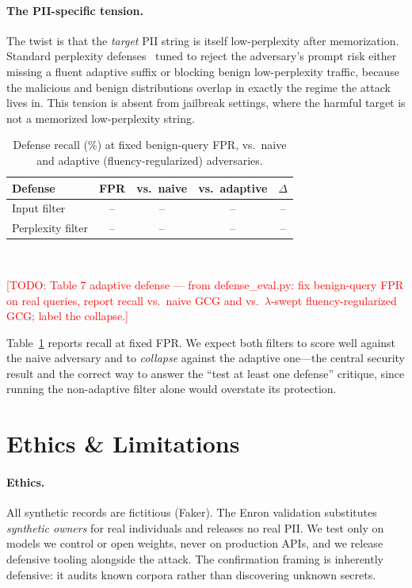 \documentclass[letterpaper,twocolumn,10pt]{article}
\newcommand{\todo}[1]{\textcolor{red}{[TODO: #1]}}
\begin{document}
\paragraph{The PII-specific tension.}
The twist is that the \emph{target} PII string is itself low-perplexity after
memorization. Standard perplexity
defenses~\cite{jain2023baseline} tuned to reject the adversary's prompt risk
either missing a fluent adaptive suffix or blocking benign low-perplexity
traffic, because the malicious and benign distributions overlap in exactly the
regime the attack lives in. This tension is absent from jailbreak settings,
where the harmful target is not a memorized low-perplexity string.

\begin{table}[t]
\centering
\caption{Defense recall (\%) at fixed benign-query FPR, vs.\ naive and adaptive
(fluency-regularized) adversaries.}
\label{tab:defense}
\small
\begin{tabular}{@{}lcccc@{}}
\toprule
\textbf{Defense} & \textbf{FPR} & \textbf{vs.\ naive} & \textbf{vs.\ adaptive} & \textbf{$\Delta$} \\
\midrule
Input filter      & -- & -- & -- & -- \\
Perplexity filter & -- & -- & -- & -- \\
\bottomrule
\end{tabular}
\\[2pt]
\raggedright\footnotesize
\todo{Table 7 adaptive defense --- from defense\_eval.py: fix benign-query FPR
on real queries, report recall vs.\ naive GCG and vs.\ $\lambda$-swept
fluency-regularized GCG; label the collapse.}
\end{table}

Table~\ref{tab:defense} reports recall at fixed FPR. We expect both filters to
score well against the naive adversary and to \emph{collapse} against the
adaptive one---the central security result and the correct way to answer the
``test at least one defense'' critique, since running the non-adaptive filter
alone would overstate its protection.

\section{Ethics \& Limitations}
\label{sec:ethics}

\paragraph{Ethics.}
All synthetic records are fictitious (Faker). The Enron validation substitutes
\emph{synthetic owners} for real individuals and releases no real PII. We test
only on models we control or open weights, never on production APIs, and we
release defensive tooling alongside the attack. The confirmation framing is
inherently defensive: it audits known corpora rather than discovering unknown
secrets.
\end{document}
